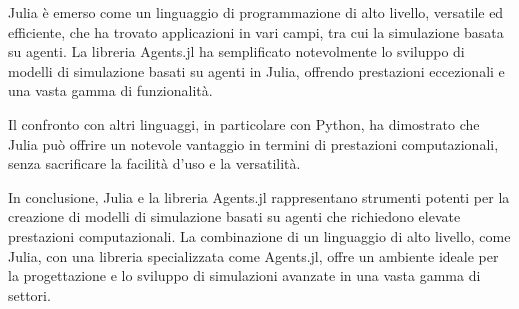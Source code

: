 Julia è emerso come un linguaggio di programmazione di alto livello, 
versatile ed efficiente, che ha trovato applicazioni in vari campi, 
tra cui la simulazione basata su agenti. La libreria Agents.jl ha 
semplificato notevolmente lo sviluppo di modelli di simulazione basati 
su agenti in Julia, offrendo prestazioni eccezionali e una vasta gamma 
di funzionalità.

Il confronto con altri linguaggi, in particolare con Python, 
ha dimostrato che Julia può offrire un notevole vantaggio in termini 
di prestazioni computazionali, senza sacrificare la facilità d'uso e 
la versatilità.

In conclusione, Julia e la libreria Agents.jl rappresentano strumenti 
potenti per la creazione di modelli di simulazione basati su agenti che 
richiedono elevate prestazioni computazionali. La combinazione di un 
linguaggio di alto livello, come Julia, con una libreria specializzata 
come Agents.jl, offre un ambiente ideale per la progettazione e lo 
sviluppo di simulazioni avanzate in una vasta gamma di settori.